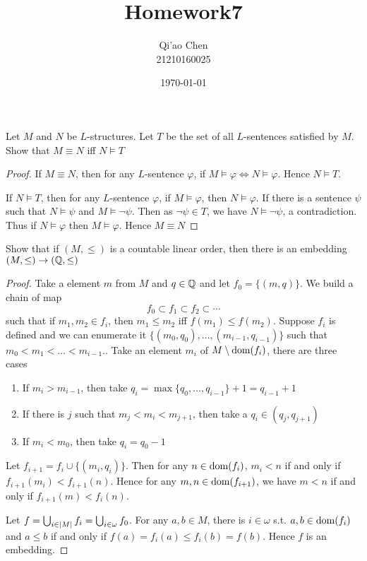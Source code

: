 \documentclass[11pt]{article}
\author{Qi'ao Chen\\21210160025}
\date{\today}
\title{Homework7}
\begin{document}
\maketitle
\begin{exercise}
Let \(M\) and \(N\) be \(L\)-structures. Let \(T\) be the set of all \(L\)-sentences satisfied
by \(M\). Show that \(M\equiv N\) iff \(N\vDash T\)
\end{exercise}

\begin{proof}
If \(M\equiv N\), then for any \(L\)-sentence \(\varphi\), if \(M\vDash\varphi\Leftrightarrow N\vDash\varphi\). Hence \(N\vDash T\).

If \(N\vDash T\), then for any \(L\)-sentence \(\varphi\), if \(M\vDash\varphi\), then \(N\vDash\varphi\). If there is a sentence \(\psi\) such
that \(N\vDash\psi\) and \(M\vDash\neg\psi\). Then as \(\neg\psi\in T\), we have \(N\vDash\neg\psi\), a contradiction. Thus if \(N\vDash\varphi\)
then \(M\vDash\varphi\). Hence \(M\equiv N\)
\end{proof}

\begin{exercise}
Show that if \((M,\le)\) is a countable linear order, then there is an embedding \((M,\le)\to(\mathbb{Q},\le)\)
\end{exercise}

\begin{proof}
Take a element \(m\) from \(M\) and \(q\in \mathbb{Q}\) and let \(f_0=\{(m,q)\}\). We build a chain of map
\begin{equation*}
f_0\subset f_1\subset f_2\subset\cdots
\end{equation*}
such that if \(m_1,m_2\in f_i\), then \(m_1\le m_2\) iff \(f(m_1)\le f(m_2)\). Suppose \(f_i\) is defined and we can enumerate it \(\{(m_0,q_0),\dots,(m_{i-1},q_{i-1})\}\)
such that \(m_0<m_1<\dots<m_{i-1}\).. Take an
element \(m_i\) of \(M\setminus\operatorname{dom}(f_i)\), there are three cases
\begin{enumerate}
\item If \(m_i>m_{i-1}\), then take \(q_i=\max\{q_0,\dots,q_{i-1}\}+1=q_{i-1}+1\)
\item If there is \(j\) such that \(m_j<m_i<m_{j+1}\), then take a \(q_i\in(q_j,q_{j+1})\)
\item If \(m_i<m_0\), then take \(q_i=q_0-1\)
\end{enumerate}


Let \(f_{i+1}=f_i\cup\{(m_i,q_i)\}\). Then for any \(n\in\operatorname{dom}(f_i)\), \(m_i<n\) if and only
if \(f_{i+1}(m_i)<f_{i+1}(n)\). Hence for any \(m,n\in\operatorname{dom}(f_{i+1})\), we have \(m<n\) if and only
if \(f_{i+1}(m)<f_i(n)\).

Let \(f=\bigcup_{i\in\abs{M}}f_i=\bigcup_{i\in\omega}f_0\). For any \(a,b\in M\), there is \(i\in\omega\) s.t. \(a,b\in\operatorname{dom}(f_i)\)
and \(a\le b\) if and only if \(f(a)=f_i(a)\le f_i(b)=f(b)\). Hence \(f\)  is an embedding.
\end{proof}
\end{document}
